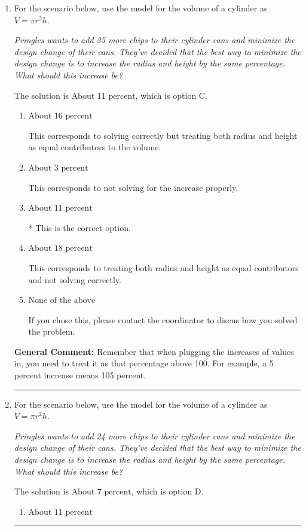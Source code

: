 \documentclass{extbook}[14pt]
\newcommand{\litem}[1]{\item #1

\rule{\textwidth}{0.4pt}}
\begin{document}
\begin{enumerate}\litem{
For the scenario below, use the model for the volume of a cylinder as $V = \pi r^2 h$.

\begin{center}
    \textit{ Pringles wants to add 35 \text{percent} more chips to their cylinder cans and minimize the design change of their cans. They've decided that the best way to minimize the design change is to increase the radius and height by the same percentage. What should this increase be? }
\end{center}
The solution is \( \text{About } 11 \text{ percent} \), which is option C.\begin{enumerate}[label=\Alph*.]
\item \( \text{About } 16 \text{ percent} \)

This corresponds to solving correctly but treating both radius and height as equal contributors to the volume.
\item \( \text{About } 3 \text{ percent} \)

This corresponds to not solving for the increase properly.
\item \( \text{About } 11 \text{ percent} \)

* This is the correct option.
\item \( \text{About } 18 \text{ percent} \)

This corresponds to treating both radius and height as equal contributors and not solving correctly.
\item \( \text{None of the above} \)

If you chose this, please contact the coordinator to discus how you solved the problem.
\end{enumerate}

\textbf{General Comment:} Remember that when plugging the increases of values in, you need to treat it as that percentage above 100. For example, a 5 percent increase means 105 percent.
}
\litem{
For the scenario below, use the model for the volume of a cylinder as $V = \pi r^2 h$.

\begin{center}
    \textit{ Pringles wants to add 24 \text{percent} more chips to their cylinder cans and minimize the design change of their cans. They've decided that the best way to minimize the design change is to increase the radius and height by the same percentage. What should this increase be? }
\end{center}
The solution is \( \text{About } 7 \text{ percent} \), which is option D.\begin{enumerate}[label=\Alph*.]
\item \( \text{About } 11 \text{ percent} \)


\end{enumerate}}
\end{enumerate}
\end{document}
